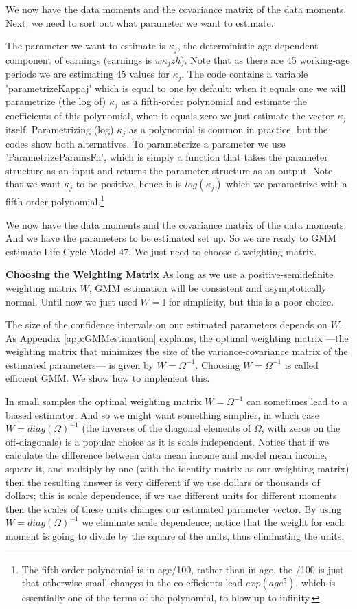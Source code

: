 We now have the data moments and the covariance matrix of the data moments. Next, we need to sort out what parameter we want to estimate.

The parameter we want to estimate is $\kappa_j$, the deterministic age-dependent component of earnings (earnings is $w \kappa_j z h$). Note that as there are 45 working-age periods we are estimating 45 values for $\kappa_j$. The code contains a variable 'parametrizeKappaj' which is equal to one by default: when it equals one we will parametrize (the log of) $\kappa_j$ as a fifth-order polynomial and estimate the coefficients of this polynomial, when it equals zero we just estimate the vector $\kappa_j$ itself. Parametrizing (log) $\kappa_j$ as a polynomial  is common in practice, but the codes show both alternatives. To parameterize a parameter we use 'ParametrizeParamsFn', which is simply a function that takes the parameter structure as an input and returns the parameter structure as an output. Note that we want $\kappa_j$ to be positive, hence it is $log(\kappa_j)$ which we parametrize with a fifth-order polynomial.\footnote{The fifth-order polynomial is in age/100, rather than in age, the /100 is just that otherwise small changes in the co-efficients lead $exp(age^5)$, which is essentially one of the terms of the polynomial, to blow up to infinity.}

We now have the data moments and the covariance matrix of the data moments. And we have the parameters to be estimated set up. So we are ready to GMM estimate Life-Cycle Model 47. We just need to choose a weighting matrix.

\noindent \textbf{Choosing the Weighting Matrix}
As long as we use a positive-semidefinite weighting matrix $W$, GMM estimation will be consistent and asymptotically normal. Until now we just used $W=\mathbb{I}$ for simplicity, but this is a poor choice.

The size of the confidence intervals on our estimated parameters depends on $W$. As Appendix \ref{app:GMMestimation} explains, the optimal weighting matrix ---the weighting matrix that minimizes the size of the variance-covariance matrix of the estimated parameters--- is given by $W=\Omega^{-1}$. Choosing $W=\Omega^{-1}$ is called efficient GMM. We show how to implement this.

In small samples the optimal weighting matrix $W=\Omega^{-1}$ can sometimes lead to a biased estimator. And so we might want something simplier, in which case $W=diag(\Omega)^{-1}$ (the inverses of the diagonal elements of $\Omega$, with zeros on the off-diagonals) is a popular choice as it is scale independent. Notice that if we calculate the difference between data mean income and model mean income, square it, and multiply by one (with the identity matrix as our weighting matrix) then the resulting answer is very different if we use dollars or thousands of dollars; this is scale dependence, if we use different units for different moments then the scales of these units changes our estimated parameter vector. By using $W=diag(\Omega)^{-1}$ we eliminate scale dependence; notice that the weight for each moment is going to divide by the square of the units, thus eliminating the units.

